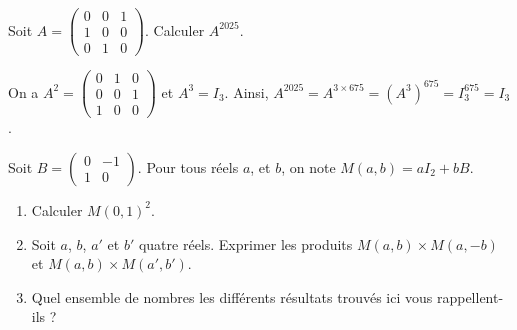 \documentclass[11pt,fleqn]{book} %
\begin{document}
\begin{exercise}[topic=mat02]Soit $A=\begin{pmatrix}0&0&1\\1&0&0\\0&1&0 \end{pmatrix}$. Calculer $A^{2025}$.\end{exercise}

\begin{solution}On a $A^2=\begin{pmatrix}0&1&0 \\0&0&1\\1&0&0\end{pmatrix}$ et $A^3=I_3$. Ainsi, $A^{2025}=A^{3 \times 675}=(A^3)^{675}=I_3^{675}=I_3$.\end{solution}

\begin{exercise}[topic=mat02]Soit $B = \begin{pmatrix} 0 & -1 \\ 1 & 0\end{pmatrix}$. Pour tous réels $a$, et $b$, on note $M(a,b)=aI_2 + bB$.
\begin{enumerate}
\item Calculer $M(0,1)^2$.
\item Soit $a$, $b$, $a'$ et $b'$ quatre réels. Exprimer les produits $M(a,b) \times M(a,-b)$ et $M(a,b) \times M(a',b')$.
\item Quel ensemble de nombres les différents résultats trouvés ici vous rappellent-ils ?
\end{enumerate}\end{exercise}
\end{document}
